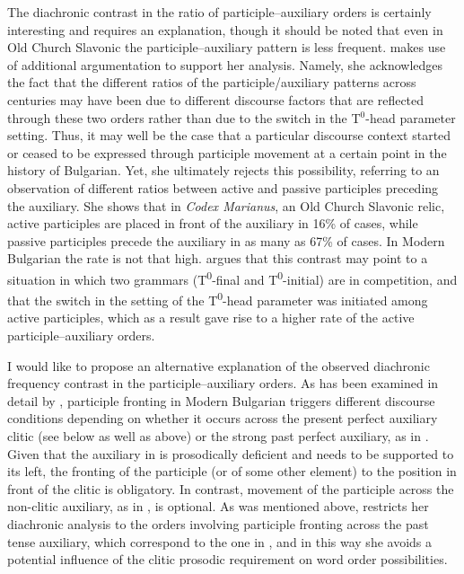 \documentclass[output=paper,
modfonts,
newtxmath,
hidelinks
]{langscibook}
\begin{document}
The diachronic contrast in the ratio of participle--auxiliary orders is certainly interesting and requires an explanation, though it should be noted that even in Old Church Slavonic the participle--auxiliary pattern is less frequent. \citet{pancheva2008} makes use of additional argumentation to support her analysis. Namely, she acknowledges the fact that the different ratios of the participle/auxiliary patterns across centuries may have been due to different discourse factors that are reflected through these two orders rather than due to the switch in the T$^0$-head parameter setting. Thus, it may well be the case that a particular discourse context started or ceased to be expressed through participle movement at a certain point in the history of Bulgarian. Yet, she ultimately rejects this possibility, referring to an observation of different ratios between active and passive participles preceding the auxiliary. She shows that in \textit{Codex Marianus}, an Old Church Slavonic relic, active participles are placed in front of the auxiliary in 16\% of cases, while passive participles precede the auxiliary in as many as 67\% of cases. In Modern Bulgarian the rate is not that high. \citeauthor{pancheva2008} argues that this contrast may point to a situation in which two grammars (T\textsuperscript{0}{}-final and T\textsuperscript{0}{}-initial) are in competition, and that the switch in the setting of the T\textsuperscript{0}{}-head parameter was initiated among active participles, which as a result gave rise to a higher rate of the active participle--auxiliary orders.

I would like to propose an alternative explanation of the observed diachronic frequency contrast in the participle--auxiliary orders. As has been examined in detail by \citet{lambova2003}, participle fronting in Modern Bulgarian triggers different discourse conditions depending on whether it occurs across the present perfect auxiliary clitic (see  below as well as  above) or the strong past perfect auxiliary, as in . Given that the auxiliary in  is prosodically deficient and needs to be supported to its left, the fronting of the participle (or of some other element) to the position in front of the clitic is obligatory. In contrast, movement of the participle across the non-clitic auxiliary, as in , is optional. As was mentioned above, \citeauthor{pancheva2008} restricts her diachronic analysis to the orders involving participle fronting across the past tense auxiliary, which correspond to the one in , and in this way she avoids a potential influence of the clitic prosodic requirement on word order possibilities.
\end{document}
